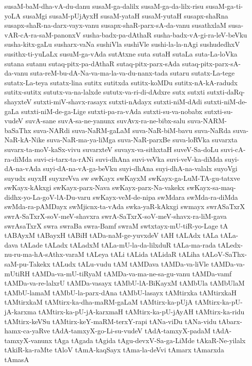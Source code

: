 {susaM-baM-dha-vA-du-danu
susaM-ga-dalilx
susaM-ga-da-lilx-risu
susaM-ga-ti-yoLA
susaMgi
susaM-pUjAyxH
susaM-yataH
susaM-yutaH
susapx-shaRna
susapx-shaR-na-darx-vayx-vanu
susapx-shaR-parx-sA-da-vanu
susathxlaM
susa-vAR-cA-ra-saM-panonxV
susha-badx-pa-dAthaR
susha-badx-vA-gi-ra-leV-beVku
susha-kitx-gaLu
susharx-vaNa
sushiVla
sushiVle
sushi-la-la-nAgi
sushudedhxV
susithx-ti-yuLaLx
susuM-ga-vAda
sutAtxne
suta
sutaH
sutaLa
suta-La-loVka
sutana
sutanu
sutaq-pitx-pa-dAthaR
sutaq-pitx-parx-sAda
sutaq-pitx-parx-sA-da-vanu
suta-reM-bu-dA-Na-va-ma-la-va-du-nanx-tada
sutaru
sutatx-La-tege
sutatx-La-teya
sutatx-lina
sutitx
sutitxda
sutitx-koMDu
sutitx-nA-kA-radudx
sutitx-sutitx
sututx-va-na-lalxde
sututx-va-ri-di-dAdxre
sutx
sutxti
sutxti-daRq-shayxteV
sutxti-miV-shavx-rasayx
sutxti-nAdayx
sutxti-niM-dAdi
sutxti-niM-de-gaLa
sutxti-niM-de-ga-Lige
sutxti-pa-ra-vAda
sutxti-su-va-nobabx
sutxti-su-vudeV
suvA-sane
suvA-sa-ne-yanunx
suvAvx-ra-ne-bibx-salu
suva-NARM-baSaThx
suva-NARdi
suva-NaRM-gaLaM
suva-NaR-biM-bavu
suva-NaRda
suva-NaR-kA-Nike
suva-NaR-ma-ya-liMga
suva-NaR-parxBe
suva-loRVka
suvarxta
suvarx-ta-moV-kaSx-vivu
suvarxteV
suvayx-va-sithxtaH
suveV-Sa-doLu
suvi-cA-ra-diMda
suvi-ci-tarx-ta-rANi
suvi-dhAna
suvi-veVka
suvi-veV-ka-diMda
suyi-dA-na-vAda
suyi-dA-na-vA-ga-beVku
suyi-dhAna
suyi-dhA-na-valalx
suyoVgi
suyudx
suyxH
suyxreVva
sw
swKayx
swKayxM
swKayx-ga-LuM-TA-gu-tatxve
swKayx-kAkxgi
swKayx-parx-Nava
swKayx-parx-Na-vakekx
swKayx-sa-maq-didhx-yo-La-goV-lA-Du-varu
swKayx-veM-de-nipa
swMdara
swMda-ra-diMda
swMda-ra-pAMDayx
swMjicnx-ta-vAda
swka-yaR-kAkxgi
swmayx
swrASaTxrX
swrA-SaTxrX-soV-meV-shavxra
swrA-SaTxrX-soV-meV-shavx-ra-liM-gava
swrAsaTxrX
swra
swraBa
swra-Bamf
swraM
swtxtayx-mU-tiR-yo-Lage
tA
tABAyxM
tABayxH
tABiH
tADa-naM-ge-yuvxdeV
tAH
tALAdx
tALa
tALa-dava
tALade
tALadx
tALadxM
tALa-mU-la-da-lilxduR
tALa-ma-rada
tALedx-nu-ru-ma-hA-sAthx-varaM
tALeya
tALi
tALida
tALidaR
tALiha
tALoV-SaThx-saM-pu-Takekx
tALudx
tALu-vudu
tAM
tAMDava
tAMDa-va-liVle
tAMDa-va-mUtiRH
tAMDa-va-mU-tiRyaM
tAMDa-va-ma-ne-sa-gu-vanu
tAMDa-vamf
tAMDa-va-re-lalxrU
tAMDa-vasayx
tAMbU-lA-BiKayxM
tAMbUla
tAMbUlaM
tAMbU-lamaM
tAMbU-la-parx-dAna
tAMbU-lasayx
tAMtirxka
tAMtirxkaH
tAMtirxkaM
tAMtirx-ka-dha-maRM-gaLaM
tAMtirx-ka-pUjA
tAMtirx-ka-pU-jA-karxma
tAMtirx-ka-pU-jA-karxmaH
tAMtirx-ka-pU-jAyAH
tAMtirx-ka-ridu
tAMtirx-keVSu
tAMtirx-keY-maRM-terxY-rapi
tANa-viDu
tANa-vidu
tAbarx-hamx-ca-yaRve
tAdA-tamxyX-go-Li-su-vudeV
tAdA-tamxyX-padaM
tAdA-tamxyX-vanunx
tAga
tAgada
tAgida
tAgu-devxV-Sa-ga-LiMde
tAkaR-Ne-yilalx
tAkiR-ka-raMte
tAloV
tAmA-kaqSayx
tAma-la-deVvi
tAmarx
tAmarxda
tAmasA
}
